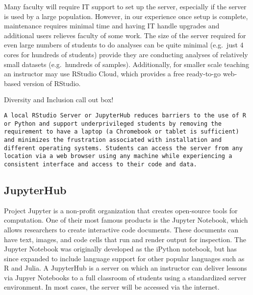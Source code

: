 \begin{itemize}
Many faculty will require IT support to set up the server, especially if the server is used by a large population. However, in our experience once setup is complete, maintenance requires minimal time and having IT handle upgrades and additional users relieves faculty of some work. The size of the server required for even large numbers of students to do analyses can be quite minimal (e.g.\ just 4 cores for hundreds of students) provide they are conducting analyses of relatively small datasets (e.g.\ hundreds of samples). Additionally, for smaller scale teaching an instructor may use RStudio Cloud, which provides a free ready-to-go web-based version of RStudio.
\end{itemize}

{\begin{framed}
Diversity and Inclusion call out box! 
\begin{snugshade*}
\begin{lstlisting}
A local RStudio Server or JupyterHub reduces barriers to the use of R or Python and support underprivileged students by removing the requirement to have a laptop (a Chromebook or tablet is sufficient) and minimizes the frustration associated with installation and different operating systems. Students can access the server from any location via a web browser using any machine while experiencing a consistent interface and access to their code and data. 
\end{lstlisting}
\end{snugshade*}
\end{framed}}

\subsection{JupyterHub}\label{JupyterHub}

Project Jupyter is a non-profit organization that creates open-source tools for computation.
One of their most famous products is the Jupyter Notebook, which allows researchers to create interactive code documents.
These documents can have text, images, and code cells that run and render output for inspection.
The Jupyter Notebook was originally developed as the iPython notebook, but has since expanded to include language support for other popular languages such as R and Julia.
A JupyterHub is a server on which an instructor can deliver lessons via Jupyer Notebooks to a full classroom of students using a standardized server environment.
In most cases, the server will be accessed via the internet.

